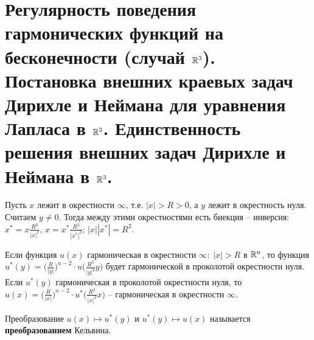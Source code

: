 \section{Регулярность поведения гармонических функций на бесконечности (случай $\mathbb{R}^3$). Постановка внешних краевых задач Дирихле и Неймана для уравнения Лапласа в $\mathbb{R}^3$. Единственность решения внешних задач Дирихле и Неймана в $\mathbb{R}^3$.}
Пусть $x$ лежит в окрестности $\infty$, т.е. $|x|>R>0$, а $y$ лежит в окрестность нуля. Считаем $y \neq 0.$ Тогда между этими окрестностями есть биекция -- инверсия:
$x^*=x \frac{R^2}{|x|^2}, \, x=x^* \frac{R^2}{|x^*|^2}; \, |x||x^*|=R^2 $.
\begin{lemma}
Если функция $u(x)$ гармоническая в окрестности $\infty: \ |x|>R$ в $\mathbb{R}^n$, то функция $u^*(y)= \big(\frac{R}{|y|}\big)^{n-2}\cdot u\big(\frac{R^2}{|y|^2} y\big)$ будет гармонической в проколотой окрестности нуля. Если $u^*(y)$ гармоническая в проколотой окрестности нуля, то $u(x)= \big(\frac{R}{|x|}\big)^{n-2}\cdot u^*\big(\frac{R^2}{|x|^2} x\big)$ -- гармоническая в окрестности $\infty$.
\end{lemma}
\begin{definition}
Преобразование $u(x) \longmapsto u^*(y)$ и $u^*(y) \longmapsto u(x)$ называется \textbf{преобразованием} Кельвина.
\end{definition}
